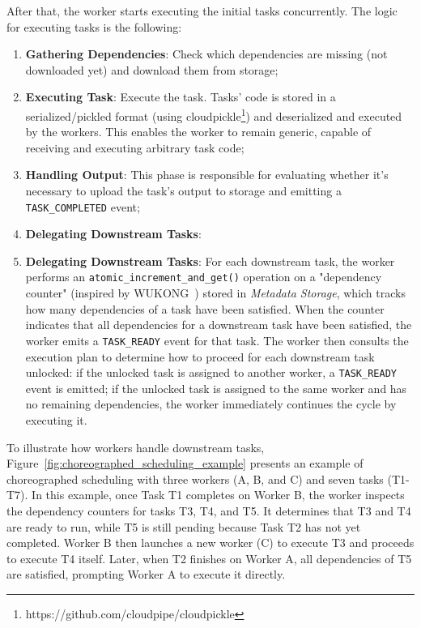 \documentclass[conference]{IEEEtran}
\begin{document}
After that, the worker starts executing the initial tasks concurrently. The logic for executing tasks is the following:
\begin{enumerate}
    \item \textbf{Gathering Dependencies}: Check which dependencies are missing (not downloaded yet) and download them from storage;
    \item \textbf{Executing Task}: Execute the task. Tasks' code is stored in a serialized/pickled format (using cloudpickle\footnote{https://github.com/cloudpipe/cloudpickle}) and deserialized and executed by the workers. This enables the worker to remain generic, capable of receiving and executing arbitrary task code;
    \item \textbf{Handling Output}: This phase is responsible for evaluating whether it's necessary to upload the task's output to storage and emitting a \texttt{TASK\_COMPLETED} event;
    \item \textbf{Delegating Downstream Tasks}: \item \textbf{Delegating Downstream Tasks}: For each downstream task, the worker performs an \texttt{atomic\_increment\_and\_get()} operation on a "dependency counter" (inspired by WUKONG~\cite{wukong_2}) stored in \textit{Metadata Storage}, which tracks how many dependencies of a task have been satisfied. When the counter indicates that all dependencies for a downstream task have been satisfied, the worker emits a \texttt{TASK\_READY} event for that task. The worker then consults the execution plan to determine how to proceed for each downstream task unlocked: if the unlocked task is assigned to another worker, a \texttt{TASK\_READY} event is emitted; if the unlocked task is assigned to the same worker and has no remaining dependencies, the worker immediately continues the cycle by executing it.
\end{enumerate}

To illustrate how workers handle downstream tasks, Figure~\ref{fig:choreographed_scheduling_example} presents an example of choreographed scheduling with three workers (A, B, and C) and seven tasks (T1-T7). In this example, once Task T1 completes on Worker B, the worker inspects the dependency counters for tasks T3, T4, and T5. It determines that T3 and T4 are ready to run, while T5 is still pending because Task T2 has not yet completed. Worker B then launches a new worker (C) to execute T3 and proceeds to execute T4 itself. Later, when T2 finishes on Worker A, all dependencies of T5 are satisfied, prompting Worker A to execute it directly.
\end{document}
